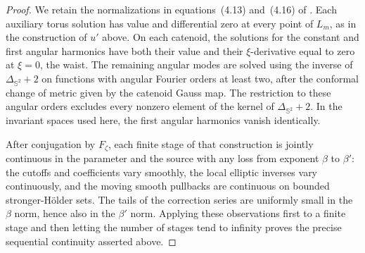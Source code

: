 \documentclass[a4paper,11pt,oneside,reqno]{amsart}
\numberwithin{equation}{section}
\theoremstyle{definition}
\begin{document}
\begin{proof}
    We retain the normalizations in equations~(4.13)
    and~(4.16) of \cite{KapouleasMcGrathLD}.
    Each auxiliary torus solution has value and
    differential zero at every point of $L_m$, as in
    the construction of $u'$ above.
    On each catenoid, the solutions for the constant
    and first angular harmonics have both their value
    and their $\xi$-derivative equal to zero at
    $\xi=0$, the waist.
    The remaining angular modes are solved using the
    inverse of $\Delta_{\mathbb{S}^2}+2$ on functions
    with angular Fourier orders at least two, after
    the conformal change of metric given by the
    catenoid Gauss map.
    The restriction to these angular orders excludes
    every nonzero element of the kernel of
    $\Delta_{\mathbb{S}^2}+2$.
    In the invariant spaces used here, the first
    angular harmonics vanish identically.
    
    After conjugation by
    $F_\zeta$, each finite stage of that construction is jointly
    continuous in the parameter and the source with any loss from
    exponent $\beta$ to $\beta'$: the cutoffs and coefficients
    vary smoothly, the local elliptic inverses vary continuously,
    and the moving smooth pullbacks are continuous on bounded
    stronger-H\"older sets. The tails of the correction series
    are uniformly small in the $\beta$ norm, hence also in the
    $\beta'$ norm. Applying these observations first to a finite
    stage and then letting the number of stages tend to infinity
    proves the precise sequential continuity asserted above.


\end{proof}
\end{document}

